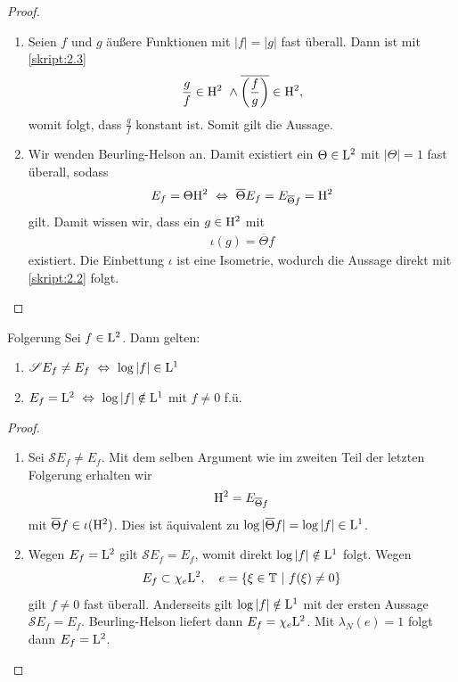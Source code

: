 \begin{proof}
	\begin{enumerate}[label=\text{\textbf{(\arabic*)}}]
		\item 
		Seien $ f $ und $ g $ äußere Funktionen mit $ |f| = |g| $ fast überall.
		Dann ist mit \ref{skript:2.3}
		\begin{align*}
		\frac{g}{f} \in \mathrm{H}^2 \ \wedge \overline{ \left(\frac{f	}{g} \right)} \in \mathrm{H}^2,
		\end{align*}
		womit folgt, dass $ \frac{g}{f} $ konstant ist. Somit gilt die Aussage.
		\item
		Wir wenden Beurling-Helson an. Damit existiert ein $ \Theta \in \mathrm{L}^2 $ mit $ |\Theta| = 1 $ fast überall, sodass
		\begin{align*}
		E_f = \Theta \H^2
		\ \Leftrightarrow \ 
		\overline{\Theta} E_f = E_{\overline{\Theta} f} = \H^2
		\end{align*}
		gilt. Damit wissen wir, dass ein $ g \in \mathrm{H}^2 $ mit
		\begin{align*}
		\iota(g) = \overline{\Theta} f
		\end{align*}
		existiert. Die Einbettung $ \iota $ ist eine Isometrie, wodurch die Aussage direkt mit \ref{skript:2.2} folgt.
	\end{enumerate}
\end{proof}

\begin{genericthm}{Folgerung}\label{skript:2.5}
	Sei $ f \in \mathrm{L}^2 $. Dann gelten:
	\begin{enumerate}[label=\text{\textbf{(\arabic*)}}]
		\item 
		$ \mathscr{S} E_f \neq E_f \ \Leftrightarrow  \ \log|f|  \in \L^1$
		\item 
		$ E_f = \L^2   \ \Leftrightarrow \ \log|f| \notin \L^1$ mit $ f \neq 0 $ f.ü.
	\end{enumerate}
\end{genericthm} 

\begin{proof}
	\begin{enumerate}[label=\text{\textbf{(\arabic*)}}]
		\item 
		Sei $ \mathscr{S} E_f \neq E_f $. Mit dem selben Argument wie im zweiten Teil der letzten Folgerung erhalten wir
		\begin{align*}
		\mathrm{H}^2 = E_{ \overline{\Theta} f}
		\end{align*}
		mit $ \overline{\Theta} f \in \iota(\mathrm{H}^2) $.
		Dies ist äquivalent zu $ \log| \overline{\Theta} f | = \log |f| \in \mathrm{L}^1 
		$.
		\item 
		Wegen $ E_f = \mathrm{L}^2 $ gilt $ \mathscr{S} E_f = E_f $, womit direkt $ \log|f| \notin \mathrm{L}^1 $ folgt.  
		Wegen 
		\begin{align*}
		E_f \subset \chi_e \mathrm{L}^2, \quad 
		e = \lbrace \xi \in \mathbb{T}\ | \ f(\xi) \neq 0 \rbrace
		\end{align*}
		gilt $ f\neq 0 $ fast überall.
		Anderseits gilt $ \log |f| \notin \mathrm{L}^1 $ mit der ersten Aussage $ \mathscr{S} E_f = E_f $. Beurling-Helson liefert dann $ E_f = \chi_e \mathrm{L}^2 $.
		Mit $ \lambda_N(e) = 1 $ folgt dann $ E_f = \mathrm{L}^2 $.
 	\end{enumerate}
\end{proof}

